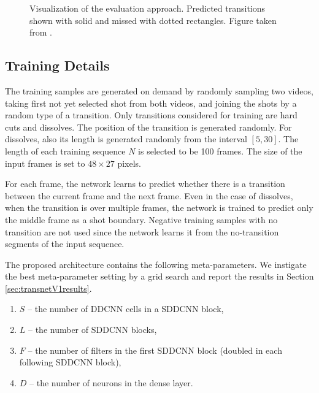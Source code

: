 \begin{figure}[ht]

    \caption[Visualization of the evaluation approach]{Visualization of the evaluation approach. Predicted transitions shown with solid and missed with dotted rectangles. Figure taken from \cite{soucek2019transnet}.}
    \label{fig:metricVis}
\end{figure}

\subsection{Training Details}\label{sec:transnetv1TrainDetails}
The training samples are generated on demand by randomly sampling two videos, taking first not yet selected shot from both videos, and joining the shots by a random type of a transition. Only transitions considered for training are hard cuts and dissolves. The position of the transition is generated randomly. For dissolves, also its length is generated randomly from the interval $[5, 30]$.  The length of each training sequence $N$ is selected to be 100 frames. The size of the input frames is set to $48\times 27$ pixels. 

For each frame, the network learns to predict whether there is a transition between the current frame and the next frame. Even in the case of dissolves, when the transition is over multiple frames, the network is trained to predict only the middle frame as a shot boundary. Negative training samples with no transition are not used since the network learns it from the no-transition segments of the input sequence.


The proposed architecture contains the following meta-parameters. We instigate the best meta-parameter setting by a grid search and report the results in Section \ref{sec:transnetV1results}.

\begin{enumerate}
\item $S$ -- the number of DDCNN cells in a SDDCNN block,
\item $L$ -- the number of SDDCNN blocks,
\item $F$ -- the number of filters in the first SDDCNN block (doubled in each following SDDCNN block),
\item $D$ -- the number of neurons in the dense layer.
\end{enumerate}

